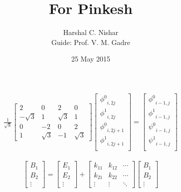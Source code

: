 \documentclass[11pt,a4paper]{article}
\title{For Pinkesh}
\author{Harshal  C. Nishar
\\Guide: Prof. V. M. Gadre}
\date{25 May 2015}
\begin{document}
\begin{align}
\frac{1}{\sqrt{8}}
\begin{bmatrix}
    2 & 0 & 2 & 0 \\
    -\sqrt{3} & 1 & \sqrt{3} & 1 \\
    0 & -2 & 0 & 2 \\
    1 & \sqrt{3} & -1 & \sqrt{3}
\end{bmatrix}
\begin{bmatrix}
	{\phi^0}_{i,2j} \\
	{\phi^1}_{i,2j} \\
	{\phi^0}_{i,2j+1} \\
	{\phi^1}_{i,2j+1} \\
\end{bmatrix}
=
\begin{bmatrix}
	{\phi^0}_{i-1,j} \\
	{\phi^1}_{i-1,j} \\
	{\psi^0}_{i-1,j} \\
	{\psi^1}_{i-1,j} \\
\end{bmatrix}
\end{align}


\begin{align}
\begin{bmatrix}
	B_1 \\
	B_2 \\
	\vdots
\end{bmatrix}
=
\begin{bmatrix}
	E_1 \\
	E_2 \\
	\vdots
\end{bmatrix}
+
\begin{bmatrix}
    k_{11} & k_{12} & \cdots \\
    k_{21} & k_{22} & \cdots \\
    \vdots & \vdots & \ddots 
\end{bmatrix}
\begin{bmatrix}
	B_1 \\
	B_2 \\
	\vdots
\end{bmatrix}
\end{align}
\end{document}
